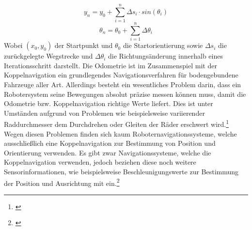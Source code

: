 \begin{equation}
y_{n} = y_{0} + \sum_{i=1}^{n} \Delta{}s_{i} \cdot sin(\theta{}_{i})
\end{equation}
\begin{equation}
\theta{}_{n} = \theta{}_{0} + \sum_{i=1}^{n} \Delta{}\theta{}_{i}
\end{equation}
Wobei $(x_{0},y_{0})$ der Startpunkt und $\theta{}_{0}$ die Startorientierung sowie $\Delta{}s_{i}$ die zurückgelegte Wegstrecke und $\Delta{}\theta{}_{i}$ die Richtungsänderung innerhalb eines Iterationsschritt darstellt.
\newline
Die Odometrie ist im Zusammenspiel mit der Koppelnavigation ein grundlegendes Navigationsverfahren für bodengebundene Fahrzeuge aller Art. Allerdings besteht ein wesentliches Problem darin, dass ein Robotersystem seine Bewegungen absolut präzise messen können muss, damit die Odometrie bzw. Koppelnavigation richtige Werte liefert. Dies ist unter Umständen aufgrund
von Problemen wie beispielsweise variierender Raddurchmesser dem Durchdrehen oder Gleiten der Räder erschwert wird.\footnote{\citep[vgl.][Handbuch Robotik, Seite 108]{Haun.HandbuchRobotik}\label{note18}}
\newline
Wegen diesen Problemen finden sich kaum Roboternavigationssysteme, welche ausschließlich eine Koppelnavigation zur Bestimmung von Position und Orientierung verwenden. Es gibt zwar Navigationssysteme, welche die Koppelnavigation verwenden, jedoch beziehen diese noch weitere Sensorinformationen, wie beispielsweise Beschleunigungswerte zur Bestimmung der Position und Ausrichtung mit ein.\footnote{\citep[vgl.][Mobile Robotik, Seite 115]{Nehmzow.MobileRobotik}\label{note19}}
